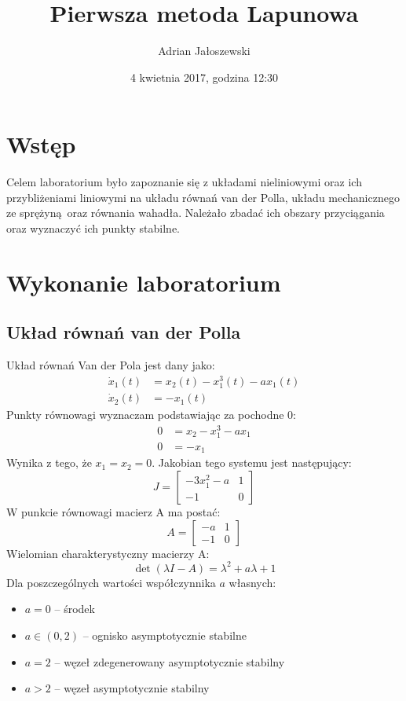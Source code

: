 \documentclass[a4paper, 10pt]{article}
\title{Pierwsza metoda Lapunowa}
\author{Adrian Jałoszewski}
\date{4 kwietnia 2017, godzina 12:30}
\begin{document}
	\maketitle
	\section{Wstęp}
		Celem laboratorium było zapoznanie się z układami nieliniowymi oraz ich przybliżeniami liniowymi na układu równań van der Polla, układu mechanicznego ze sprężyną oraz równania wahadła. Należało zbadać ich obszary przyciągania oraz wyznaczyć ich punkty stabilne.
	\section{Wykonanie laboratorium}
		\subsection{Układ równań van der Polla}
			Układ równań Van der Pola jest dany jako:
			$$
				\begin{aligned}
					\dot{x}_1(t) & = x_2(t) - x_1^3(t) - a x_1(t) \\
					\dot{x}_2(t) & = - x_1(t)
				\end{aligned}
			$$
			Punkty równowagi wyznaczam podstawiając za pochodne 0:
				$$
				\begin{aligned}
					0 & = x_2 - x_1^3 - a x_1 \\
					0 & = -x_1
				\end{aligned}
				$$
			Wynika z tego, że $x_1 = x_2 = 0$. Jakobian tego systemu jest następujący:
			$$
				J = \begin{bmatrix}
					-3x_1^2 -a & 1 \\
					-1 & 0
				\end{bmatrix}
			$$
			W punkcie równowagi macierz A ma postać:
			$$
				A = \begin{bmatrix}
				-a & 1 \\
				-1 & 0
				\end{bmatrix}
			$$
			Wielomian charakterystyczny macierzy A:
			$$
				\det(\lambda I - A) = \lambda ^ 2 + a \lambda + 1
			$$
			Dla poszczególnych wartości współczynnika $a$ własnych:
			\begin{itemize}
				\item[] $a = 0$ -- środek 
				\item[] $a \in (0, 2)$ -- ognisko asymptotycznie stabilne
				\item[] $a = 2$ -- węzeł zdegenerowany asymptotycznie stabilny
				\item[]	$a > 2$ -- węzeł asymptotycznie stabilny
			\end{itemize}
			
\end{document}
